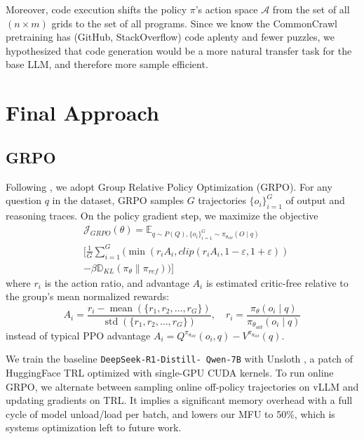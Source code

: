 \documentclass{article}
\begin{document}
Moreover, code execution shifts the policy $\pi$'s action space $\mathcal{A}$ from the set of all $(n \times m)$ grids to the set of all programs. Since we know the CommonCrawl pretraining has (GitHub, StackOverflow) code aplenty and fewer puzzles, we hypothesized that code generation would be a more natural transfer task for the base LLM, and therefore more sample efficient.


\section{Final Approach}

\subsection{GRPO}

Following \cite{r1,GRPO}, we adopt Group Relative Policy Optimization (GRPO). For any question $q$ in the dataset, GRPO samples $G$ trajectories $\{o_i\}_{i=1}^G$ of output and reasoning traces. On the policy gradient step, we maximize the objective
\begin{align*}
   & \mathcal{J}_{GRPO}(\theta)  = \mathbb{E}_{q \sim P(Q), \{o_i\}_{i=1}^G \sim \pi_{\theta_{old}}(O \mid q)} \\
   & [ \frac{1}{G} \sum_{i=1}^G ( \min ( r_iA_i, clip(r_iA_i, 1-\varepsilon, 1+\varepsilon) )                  \\ & - \beta \mathbb{D}_{KL}(\pi_\theta \| \pi_{ref}) ) ]
\end{align*}
where $r_i$ is the action ratio, and advantage $A_i$ is estimated critic-free relative to the group's mean normalized rewards:
$$
  A_i = \frac{r_i - \operatorname{mean}(\{r_1, r_2, \ldots, r_G\})}{\operatorname{std}(\{r_1, r_2, \ldots, r_G\})}, \quad r_i = \frac{\pi_\theta(o_i \mid q)}{\pi_{\theta_{old}}(o_i \mid q)}
$$
instead of typical PPO advantage $A_i = Q^{\pi_{\theta_{old}}}(o_i, q) - V^{\pi_{\theta_{old}}}(q)$.

We train the baseline \texttt{DeepSeek-R1-Distill- Qwen-7B} with Unsloth \cite{unsloth}, a patch of HuggingFace TRL \cite{trl} optimized with single-GPU CUDA kernels. To run online GRPO, we alternate between sampling online off-policy trajectories on vLLM \cite{vllm} and updating gradients on TRL. It implies a significant memory overhead with a full cycle of model unload/load per batch, and lowers our MFU to 50\%, which is systems optimization left to future work.
\end{document}
